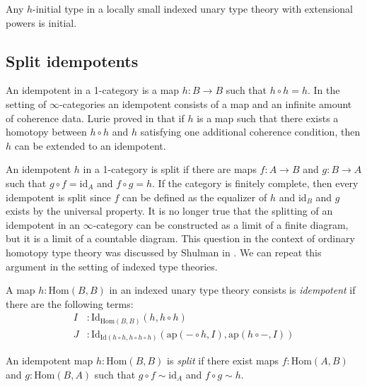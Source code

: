 \documentclass[reqno]{amsart}
\theoremstyle{definition}
\theoremstyle{remark}
\newcommand{\fs}[1]{\mathrm{#1}}
\newcommand{\Hom}{\fs{Hom}}
\newcommand{\Id}{\fs{Id}}
\newcommand{\id}{\fs{id}}
\newcommand{\pmap}{\fs{ap}}
\numberwithin{figure}{section}
\begin{document}
\begin{cor}
Any $h$-initial type in a locally small indexed unary type theory with extensional powers is initial.
\end{cor}

\subsection{Split idempotents}

An idempotent in a 1-category is a map $h : B \to B$ such that $h \circ h = h$.
In the setting of $\infty$-categories an idempotent consists of a map and an infinite amount of coherence data.
Lurie proved in \cite[Lemma~7.3.5.14]{lurie-algebra} that if $h$ is a map such that there exists a homotopy between $h \circ h$ and $h$ satisfying one additional coherence condition, then $h$ can be extended to an idempotent.

An idempotent $h$ in a 1-category is split if there are maps $f : A \to B$ and $g : B \to A$ such that $g \circ f = \id_A$ and $f \circ g = h$.
If the category is finitely complete, then every idempotent is split since $f$ can be defined as the equalizer of $h$ and $\id_B$ and $g$ exists by the universal property.
It is no longer true that the splitting of an idempotent in an $\infty$-category can be constructed as a limit of a finite diagram, but it is a limit of a countable diagram.
This question in the context of ordinary homotopy type theory was discussed by Shulman in \cite{split-idemp}.
We can repeat this argument in the setting of indexed type theories.

\begin{defn}
A map $h : \Hom(B,B)$ in an indexed unary type theory consists is \emph{idempotent} if there are the following terms:
\begin{align*}
I & : \Id_{\Hom(B,B)}(h, h \circ h) \\
J & : \Id_{\Id(h \circ h, h \circ h \circ h)}(\pmap(- \circ h, I), \pmap(h \circ -, I))
\end{align*}
\end{defn}

\begin{defn}
An idempotent map $h : \Hom(B,B)$ is \emph{split} if there exist maps $f : \Hom(A,B)$ and $g : \Hom(B,A)$ such that $g \circ f \sim \id_A$ and $f \circ g \sim h$.
\end{defn}
\end{document}
